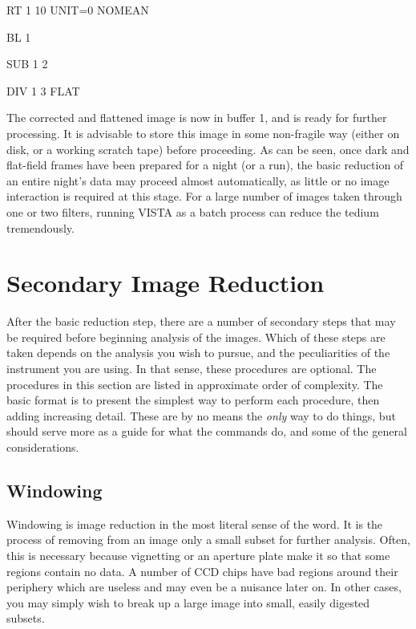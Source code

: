 \begin{command}
      \item RT 1 10 UNIT=0 NOMEAN 
      \item BL 1
\end{command}      

\begin{command}
      \item SUB 1 2
\end{command}

\begin{command}
      \item DIV 1 3 FLAT
\end{command}
The corrected and flattened image is now in buffer 1, and is ready for further
processing.  It is advisable to store this image in some non-fragile way
(either on disk, or a working scratch tape) before proceeding. As can be seen,
once dark and flat-field frames have been prepared for a night (or a run), the
basic reduction of an entire night's data may proceed almost automatically, as
little or no image interaction is required at this stage. For a large number
of images taken through one or two filters, running VISTA as a batch process
can reduce the tedium tremendously. 


\section{Secondary Image Reduction}

After the basic reduction step, there are a number of secondary steps that may
be required before beginning analysis of the images.  Which of these steps are
taken depends on the analysis you wish to pursue, and the peculiarities of the
instrument you are using.  In that sense, these procedures are optional.  The
procedures in this section are listed in approximate order of complexity.  The
basic format is to present the simplest way to perform each procedure, then
adding increasing detail.  These are by no means the {\it only} way to do
things, but should serve more as a guide for what the commands do, and some of
the general considerations. 

\subsection{Windowing}
\label{sec:imwindow}
Windowing is image reduction in the most literal sense of the word.  It is the
process of removing from an image only a small subset for further analysis. 
Often, this is necessary because vignetting or an aperture plate make it so
that some regions contain no data.  A number of CCD chips have bad regions
around their periphery which are useless and may even be a nuisance later on.
In other cases, you may simply wish to break up a large image into small,
easily digested subsets. 

